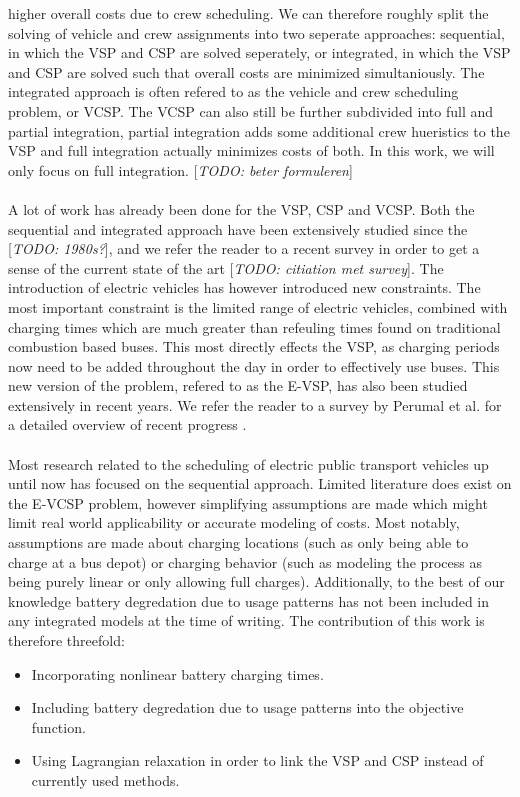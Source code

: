 \documentclass[ht]{article}
\newcommand{\todo}[1]{{\color{red}[\textit{TODO: #1}]}}
\begin{document}
higher overall costs due to crew scheduling. We can therefore roughly split the
solving of vehicle and crew assignments into two seperate approaches:
sequential, in which the VSP and CSP are solved seperately, or integrated, in
which the VSP and CSP are solved such that overall costs are minimized
simultaniously. The integrated approach is often refered to as the vehicle and
crew scheduling problem, or VCSP. The VCSP can also still be further subdivided
into full and partial integration, partial integration adds some additional
crew hueristics to the VSP and full integration actually minimizes costs of
both. In this work, we will only focus on full integration. \todo{beter
  formuleren} \\\\ A lot of work has already been done for the VSP, CSP and VCSP.
Both the sequential and integrated approach have been extensively studied since
the \todo{1980s?}, and we refer the reader to a recent survey in order to get a
sense of the current state of the art \todo{citiation met survey}. The
introduction of electric vehicles has however introduced new constraints. The
most important constraint is the limited range of electric vehicles, combined
with charging times which are much greater than refeuling times found on
traditional combustion based buses. This most directly effects the VSP, as
charging periods now need to be added throughout the day in order to
effectively use buses. This new version of the problem, refered to as the
E-VSP, has also been studied extensively in recent years. We refer the reader
to a survey by Perumal et al. for a detailed overview of recent progress
\cite{Perumal2022LitRev}. \\\\ Most research related to the scheduling of
electric public transport vehicles up until now has focused on the sequential
approach. Limited literature does exist on the E-VCSP problem, however
simplifying assumptions are made which might limit real world applicability or
accurate modeling of costs. Most notably, assumptions are made about charging
locations (such as only being able to charge at a bus depot) or charging
behavior (such as modeling the process as being purely linear or only allowing
full charges). Additionally, to the best of our knowledge battery degredation
due to usage patterns has not been included in any integrated models at the
time of writing. The contribution of this work is therefore threefold:
\begin{itemize}
  \item Incorporating nonlinear battery charging times.
  \item Including battery degredation due to usage patterns into the objective
        function.
  \item Using Lagrangian relaxation in order to link the VSP and CSP instead of
        currently used methods.
\end{itemize}
\end{document}
